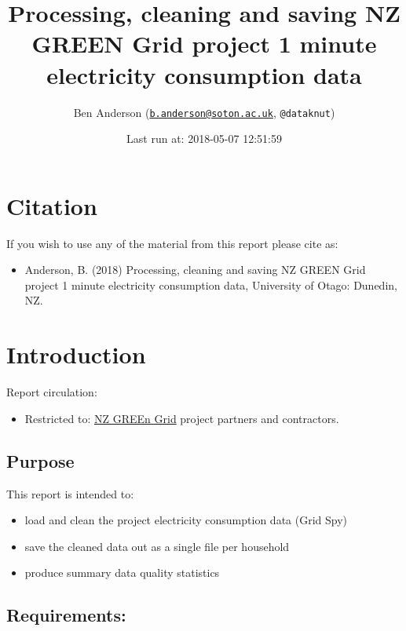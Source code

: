 \documentclass[]{article}
\title{Processing, cleaning and saving NZ GREEN Grid project 1 minute
electricity consumption data}
\author{Ben Anderson
(\href{mailto:b.anderson@soton.ac.uk}{\nolinkurl{b.anderson@soton.ac.uk}},
\texttt{@dataknut})}
\date{Last run at: 2018-05-07 12:51:59}
\providecommand{\tightlist}{%
  \setlength{\itemsep}{0pt}\setlength{\parskip}{0pt}}
\begin{document}
\maketitle

{
\setcounter{tocdepth}{2}
\tableofcontents
}
\newpage

\section{Citation}\label{citation}

If you wish to use any of the material from this report please cite as:

\begin{itemize}
\tightlist
\item
  Anderson, B. (2018) Processing, cleaning and saving NZ GREEN Grid
  project 1 minute electricity consumption data, University of Otago:
  Dunedin, NZ.
\end{itemize}

\newpage

\section{Introduction}\label{introduction}

Report circulation:

\begin{itemize}
\tightlist
\item
  Restricted to:
  \href{https://www.otago.ac.nz/centre-sustainability/research/energy/otago050285.html}{NZ
  GREEn Grid} project partners and contractors.
\end{itemize}

\subsection{Purpose}\label{purpose}

This report is intended to:

\begin{itemize}
\tightlist
\item
  load and clean the project electricity consumption data (Grid Spy)
\item
  save the cleaned data out as a single file per household
\item
  produce summary data quality statistics
\end{itemize}

\subsection{Requirements:}\label{requirements}
\end{document}
